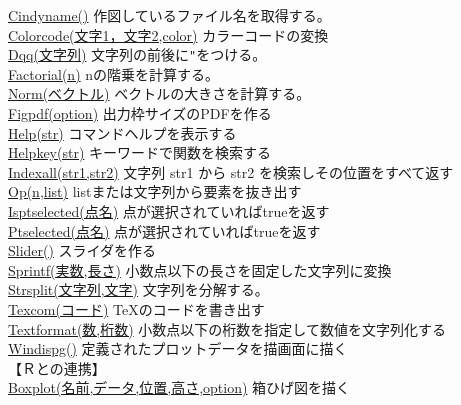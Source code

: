\documentclass[papersize,a4paper,12pt,uplatex]{jsarticle}
\begin{document}
\begin{tabbing}
\hyperlink{cindyname}{Cindyname()}    \>作図しているファイル名を取得する。\\
\hyperlink{colorcode}{Colorcode(文字1，文字2,color)}  \>カラーコードの変換\\
\hyperlink{dqq}{Dqq(文字列)}  \>文字列の前後に\verb|"|をつける。\\
\hyperlink{factorial}{Factorial(n)}  \>nの階乗を計算する。\\
\hyperlink{norm}{Norm(ベクトル)}  \>ベクトルの大きさを計算する。\\
\hyperlink{figpdf}{Figpdf(option)} \>出力枠サイズのPDFを作る\\
\hyperlink{help}{Help(str)}    \>コマンドヘルプを表示する\\
\hyperlink{helpkey}{Helpkey(str)}    \>キーワードで関数を検索する\\
\hyperlink{indexall}{Indexall(str1,str2)} \>文字列 str1 から str2 を検索しその位置をすべて返す\\
\hyperlink{op}{Op(n,list)}   \> listまたは文字列から要素を抜き出す\\
\hyperlink{isptselected}{Isptselected(点名)} \>点が選択されていればtrueを返す\\
\hyperlink{isptselected}{Ptselected(点名)} \>点が選択されていればtrueを返す\\
\hyperlink{slider}{Slider()}  \>スライダを作る\\
\hyperlink{sprintf}{Sprintf(実数,長さ)}  \>小数点以下の長さを固定した文字列に変換\\
\hyperlink{strsplit}{Strsplit(文字列,文字)}  \>文字列を分解する。\\
\hyperlink{texcom}{Texcom(コード)} \>\TeX のコードを書き出す\\
\hyperlink{textformat}{Textformat(数,桁数)}   \>小数点以下の桁数を指定して数値を文字列化する\\
\hyperlink{windispg}{Windispg()}  \>定義されたプロットデータを描画面に描く\\
\vspace{\baselineskip}
【Ｒとの連携】\\
\hyperlink{boxplot}{Boxplot(名前,データ,位置,高さ,option)} \>箱ひげ図を描く\\

\end{tabbing}
\end{document}
